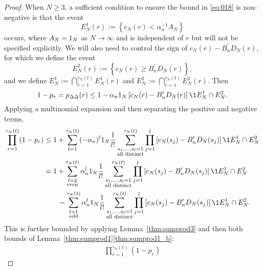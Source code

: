 \begin{proof}
When $N \geq 3$, a sufficient condition to ensure the bound in \eqref{eq:018} is non-negative is that the event
\begin{equation}\label{eq:defn_E1}
E_N^{1}(r) := \left\{ c_N(r) < \alpha_n^{-1} A_N \right\} 
\end{equation}
occurs, where $A_N = 1_N$ as $N\to\infty$ and is independent of $r$ but will not be specified explicitly.
We will also need to control the sign of $c_N(r) - B_n^\prime D_N(r)$, for which we define the event
\begin{equation}\label{eq:defn_E2}
E_N^2(r) := \left\{ c_N(r) \geq B_n^\prime D_N(r) \right\} ,
\end{equation}
and we define $E_N^1 := \bigcap_{r=1}^{\tau_N(t)} E_N^1(r)$ and $E_N^2 := \bigcap_{r=1}^{\tau_N(t)} E_N^2(r)$.
Then
\begin{equation*}
1-p_r
= p_{\Delta\Delta}(r) \leq 1 - \alpha_n \ON 
        \left[ c_N(r) - B_n^\prime D_N(r) \right] \1{E_N^1 \cap E_N^2} .
\end{equation*}
Applying a multinomial expansion and then separating the positive and negative terms,
\begin{align}
\prod_{r=1}^{\tau_N(t)} (1-p_r)
&\leq 1 + \sum_{l=1}^{\tau_N(t)} (- \alpha_n)^l \ON 
        \frac{1}{l!} \sum_{\substack{ s_1, \dots, s_l =1 \\ \text{all distinct} }}^{\tau_N(t)}
        \prod_{j=1}^l
        \left[ c_N(s_j) - B_n^\prime D_N(s_j) \right] \1{E_N^1 \cap E_N^2} \notag\\
&= 1 + \sum_{\substack{l=2 \\ \text{even} }}^{\tau_N(t)} 
        \alpha_n^l \ON \frac{1}{l!} 
        \sum_{\substack{ s_1, \dots, s_l =1 \\ \text{all distinct} }}^{\tau_N(t)}
        \prod_{j=1}^l
        \left[ c_N(s_j) - B_n^\prime D_N(s_j) \right] \1{E_N^1 \cap E_N^2} \notag\\
    &\qquad- \sum_{\substack{l=1 \\ \text{odd} }}^{\tau_N(t)} 
        \alpha_n^l \ON \frac{1}{l!} 
        \sum_{\substack{ s_1, \dots, s_l =1 \\ \text{all distinct} }}^{\tau_N(t)}
        \prod_{j=1}^l
        \left[ c_N(s_j) - B_n^\prime D_N(s_j) \right] \1{E_N^1 \cap E_N^2} .
        \label{eq:019}
\end{align}
This is further bounded by applying Lemma~\ref{thm:sumprod3} and then both bounds of Lemma~\ref{thm:sumprod1}\ref{thm:sumprod1_b}:
\begin{align*}
\prod_{r=1}^{\tau_N(t)} (1-p_r)

\end{align*}
\end{proof}

